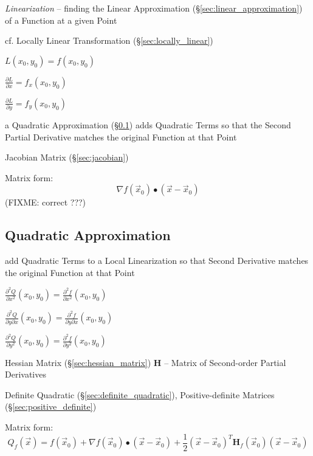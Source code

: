 \emph{Linearization} -- finding the Linear Approximation
(\S\ref{sec:linear_approximation}) of a Function at a given Point

\fist cf. Locally Linear Transformation (\S\ref{sec:locally_linear})

$L(x_0,y_0) = f(x_0,y_0)$

$\frac{\partial{L}}{\partial{x}} = f_x(x_0,y_0)$

$\frac{\partial{L}}{\partial{y}} = f_y(x_0,y_0)$

a Quadratic Approximation (\S\ref{sec:quadratic_approximation}) adds Quadratic
Terms so that the Second Partial Derivative matches the original Function at
that Point

\fist Jacobian Matrix (\S\ref{sec:jacobian})

Matrix form:
\[
  \nabla f(\vec{x}_0) \bullet (\vec{x}-\vec{x}_0)
\]
(FIXME: correct ???)



\subsection{Quadratic Approximation}\label{sec:quadratic_approximation}

add Quadratic Terms to a Local Linearization so that Second Derivative matches
the original Function at that Point

$\frac{\partial^2{Q}}{\partial{x^2}}(x_0,y_0) =
  \frac{\partial^2{f}}{\partial{x^2}}(x_0,y_0)$

$\frac{\partial^2{Q}}{\partial{y}\partial{x}}(x_0,y_0) =
  \frac{\partial^2{f}}{\partial{y}\partial{x}}(x_0,y_0)$

$\frac{\partial^2{Q}}{\partial{y^2}}(x_0,y_0) =
  \frac{\partial^2{f}}{\partial{y^2}}(x_0,y_0)$

\fist Hessian Matrix (\S\ref{sec:hessian_matrix}) $\mathbf{H}$ -- Matrix of
Second-order Partial Derivatives

\fist Definite Quadratic (\S\ref{sec:definite_quadratic}), Positive-definite
Matrices (\S\ref{sec:positive_definite})

Matrix form:
\[
  Q_f(\vec{x}) = f(\vec{x}_0) + \nabla{f(\vec{x}_0)}\bullet (\vec{x}-\vec{x}_0)
  + \frac{1}{2}(\vec{x}-\vec{x}_0)^T\mathbf{H}_f(\vec{x}_0)(\vec{x}-\vec{x}_0)
\]



